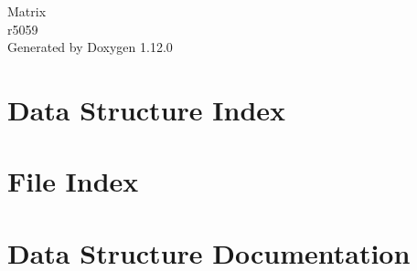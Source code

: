 \documentclass[twoside]{book}
\newcommand{\+}{\discretionary{\mbox{\scriptsize$\hookleftarrow$}}{}{}}
\newcommand{\clearemptydoublepage}{%
    \newpage{\pagestyle{empty}\cleardoublepage}%
  }
\begin{document}
  \raggedbottom
    \hypersetup{pageanchor=false,
                bookmarksnumbered=true,
                pdfencoding=unicode
               }
  \begin{titlepage}
  \vspace*{7cm}
  \begin{center}%
  {\Large Matrix}\\
  [1ex]\large r5059 \\
  \vspace*{1cm}
  {\large Generated by Doxygen 1.12.0}\\
  \end{center}
  \end{titlepage}
  \clearemptydoublepage
  \tableofcontents
  \clearemptydoublepage
  \hypersetup{pageanchor=true}
\chapter{Data Structure Index}

\chapter{File Index}

\chapter{Data Structure Documentation}




\end{document}
